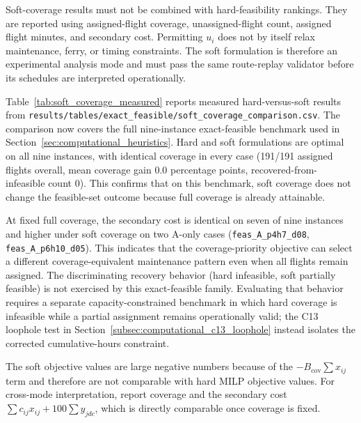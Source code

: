 Soft-coverage results must not be combined with hard-feasibility rankings. They
are reported using assigned-flight coverage, unassigned-flight count, assigned
flight minutes, and secondary cost. Permitting $u_i$ does not by itself relax
maintenance, ferry, or timing constraints. The soft formulation is therefore
an experimental analysis mode and must pass the same route-replay validator
before its schedules are interpreted operationally.

Table~\ref{tab:soft_coverage_measured} reports measured hard-versus-soft
results from
\texttt{results/tables/exact\_feasible/soft\_coverage\_comparison.csv}.
The comparison now covers the full nine-instance exact-feasible benchmark used
in Section~\ref{sec:computational_heuristics}. Hard and soft formulations are
optimal on all nine instances, with identical coverage in every case
(191/191 assigned flights overall, mean coverage gain $0.0$ percentage points,
recovered-from-infeasible count $0$). This confirms that on this benchmark,
soft coverage does not change the feasible-set outcome because full coverage is
already attainable.

At fixed full coverage, the secondary cost is identical on seven of nine
instances and higher under soft coverage on two A-only cases
(\texttt{feas\_A\_p4h7\_d08}, \texttt{feas\_A\_p6h10\_d05}). This indicates
that the coverage-priority objective can select a different
coverage-equivalent maintenance pattern even when all flights remain assigned.
The discriminating recovery behavior (hard infeasible, soft partially feasible)
is not exercised by this exact-feasible family. Evaluating that behavior
requires a separate capacity-constrained benchmark in which hard coverage is
infeasible while a partial assignment remains operationally valid; the C13
loophole test in Section~\ref{subsec:computational_c13_loophole} instead
isolates the corrected cumulative-hours constraint.

The soft objective values are large negative numbers because of the
$-B_{\mathrm{cov}}\sum x_{ij}$ term and therefore are not comparable with hard
MILP objective values. For cross-mode interpretation, report coverage and the
secondary cost
$\sum c_{ij}x_{ij}+100\sum y_{jdc}$,
which is directly comparable once coverage is fixed.

